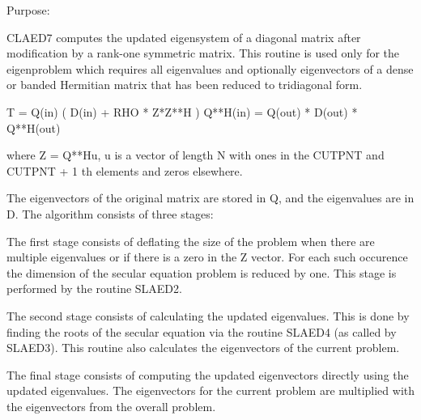  \begin{DoxyParagraph}{Purpose\+: }
\begin{DoxyVerb} CLAED7 computes the updated eigensystem of a diagonal
 matrix after modification by a rank-one symmetric matrix. This
 routine is used only for the eigenproblem which requires all
 eigenvalues and optionally eigenvectors of a dense or banded
 Hermitian matrix that has been reduced to tridiagonal form.

   T = Q(in) ( D(in) + RHO * Z*Z**H ) Q**H(in) = Q(out) * D(out) * Q**H(out)

   where Z = Q**Hu, u is a vector of length N with ones in the
   CUTPNT and CUTPNT + 1 th elements and zeros elsewhere.

    The eigenvectors of the original matrix are stored in Q, and the
    eigenvalues are in D.  The algorithm consists of three stages:

       The first stage consists of deflating the size of the problem
       when there are multiple eigenvalues or if there is a zero in
       the Z vector.  For each such occurence the dimension of the
       secular equation problem is reduced by one.  This stage is
       performed by the routine SLAED2.

       The second stage consists of calculating the updated
       eigenvalues. This is done by finding the roots of the secular
       equation via the routine SLAED4 (as called by SLAED3).
       This routine also calculates the eigenvectors of the current
       problem.

       The final stage consists of computing the updated eigenvectors
       directly using the updated eigenvalues.  The eigenvectors for
       the current problem are multiplied with the eigenvectors from
       the overall problem.\end{DoxyVerb}
 
\end{DoxyParagraph}

